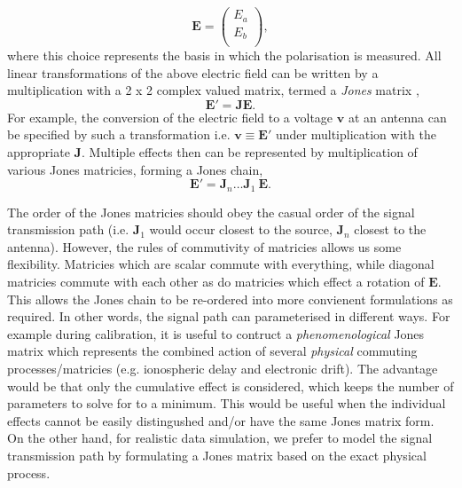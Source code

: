 \begin{equation*}
\bm{E} = \left(
\begin{array}{c}
E_a \\
E_b \\
\end{array} \right),
\end{equation*}
\noindent where this choice represents the basis in which the polarisation is measured. All linear transformations of the above electric field can be written by a multiplication with a 2 x 2 complex valued matrix, termed a \emph{Jones} matrix \citep{Jones_1941},
\begin{equation}
\bm{E'} = \bm{J E}.
\end{equation}
For example, the conversion of the electric field to a voltage $\bm{v}$ at an antenna can be specified by such a transformation i.e. $\bm{v} \equiv \bm{E'}$ under multiplication with the appropriate $\bm{J}$. Multiple effects then can be represented by multiplication of various Jones matricies, forming a Jones chain,
\begin{equation}
\bm{E'} = \bm{J}_n \ldots \bm{J}_1\ \bm{E}.
\end{equation}

The order of the Jones matricies should obey the casual order of the signal transmission path (i.e. $\bm{J}_1$ would occur closest to the source, $\bm{J}_n$ closest to the antenna). However, the rules of commutivity of matricies allows us some flexibility. Matricies which are scalar commute with everything, while diagonal matricies commute with each other as do matricies which effect a rotation of $\bm{E}$. This allows the Jones chain to be re-ordered into more convienent formulations as required. In other words, the signal path can parameterised in different ways. For example during calibration, it is useful to contruct a \emph{phenomenological} Jones matrix which represents the combined action of several \emph{physical} commuting processes/matricies (e.g. ionospheric delay and electronic drift). The advantage would be that only the cumulative effect is considered, which keeps the number of parameters to solve for to a minimum. This would be useful when the individual effects cannot be easily distingushed and/or have the same Jones matrix form. On the other hand, for realistic data simulation, we prefer to model the signal transmission path by formulating a Jones matrix based on the exact physical process.


